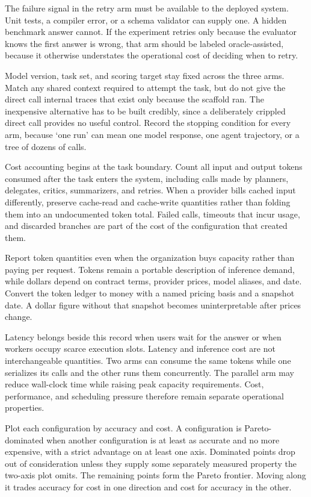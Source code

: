 The failure signal in the retry arm must be available to the deployed system. Unit tests, a compiler error, or a schema validator can supply one. A hidden benchmark answer cannot. If the experiment retries only because the evaluator knows the first answer is wrong, that arm should be labeled oracle-assisted, because it otherwise understates the operational cost of deciding when to retry.

Model version, task set, and scoring target stay fixed across the three arms. Match any shared context required to attempt the task, but do not give the direct call internal traces that exist only because the scaffold ran. The inexpensive alternative has to be built credibly, since a deliberately crippled direct call provides no useful control. Record the stopping condition for every arm, because `one run' can mean one model response, one agent trajectory, or a tree of dozens of calls.

Cost accounting begins at the task boundary. Count all input and output tokens consumed after the task enters the system, including calls made by planners, delegates, critics, summarizers, and retries. When a provider bills cached input differently, preserve cache-read and cache-write quantities rather than folding them into an undocumented token total. Failed calls, timeouts that incur usage, and discarded branches are part of the cost of the configuration that created them.

Report token quantities even when the organization buys capacity rather than paying per request. Tokens remain a portable description of inference demand, while dollars depend on contract terms, provider prices, model aliases, and date. Convert the token ledger to money with a named pricing basis and a snapshot date. A dollar figure without that snapshot becomes uninterpretable after prices change.

Latency belongs beside this record when users wait for the answer or when workers occupy scarce execution slots. Latency and inference cost are not interchangeable quantities. Two arms can consume the same tokens while one serializes its calls and the other runs them concurrently. The parallel arm may reduce wall-clock time while raising peak capacity requirements. Cost, performance, and scheduling pressure therefore remain separate operational properties.

Plot each configuration by accuracy and cost. A configuration is Pareto-dominated when another configuration is at least as accurate and no more expensive, with a strict advantage on at least one axis. Dominated points drop out of consideration unless they supply some separately measured property the two-axis plot omits. The remaining points form the Pareto frontier. Moving along it trades accuracy for cost in one direction and cost for accuracy in the other.

